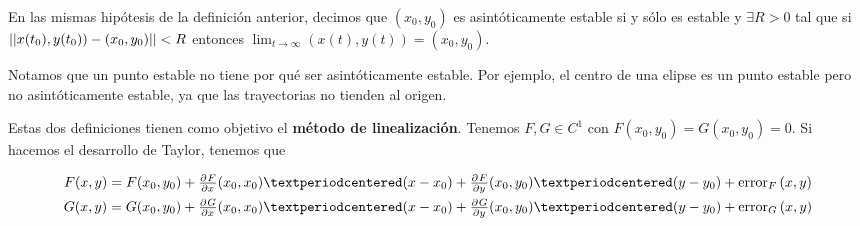 \begin{definition}

En las mismas hipótesis de la definición anterior, decimos que $(x_0,y_0)$ es asintóticamente estable si y sólo es estable y $∃R>0$ tal que si $||x(t_0), y(t_0)) - (x_0,y_0)|| < R$ entonces $\lim_{t\to ∞} (x(t), y(t)) = (x_0, y_0)$.
\end{definition}

\begin{figure}[hbtp]
\centering
{}
\end{figure}

Notamos que un punto estable no tiene por qué ser asintóticamente estable. Por ejemplo, el centro de una elipse es un punto estable pero no asintóticamente estable, ya que las trayectorias no tienden al origen.

Estas dos definiciones tienen como objetivo el \textbf{método de linealización}. Tenemos $F,G∈C^1$ con $F(x_0,y_0) = G(x_0, y_0) = 0$. Si hacemos el desarrollo de Taylor, tenemos que 

\begin{gather*}
F(x,y) = F(x_0, y_0) + \pd{F}{x}(x_0,x_0) · (x-x_0) + \pd{F}{y}(x_0, y_0) · (y-y_0) + \mathrm{error}_F \,(x,y) \\
G(x,y) = G(x_0, y_0) + \pd{G}{x}(x_0,x_0) · (x-x_0) + \pd{G}{y}(x_0, y_0) · (y-y_0)+ \mathrm{error}_G \,(x,y)
\end{gather*}

